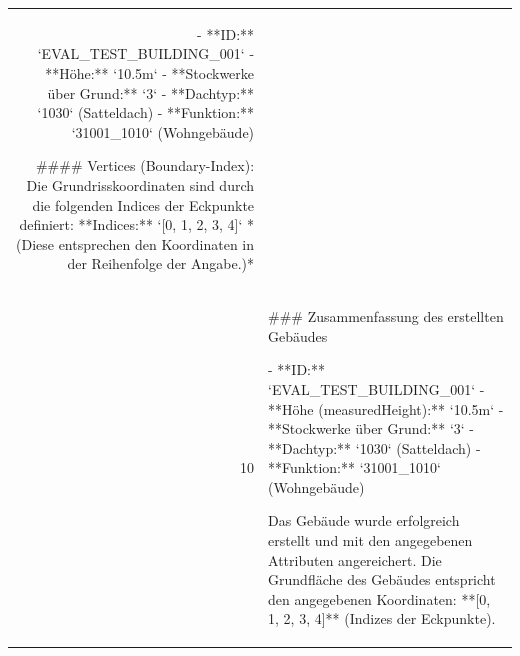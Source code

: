 \documentclass[a4paper,11pt]{article}
\begin{document}
\begin{table}[ht]
\begin{tabular}{r p{12cm}}
- **ID:** `EVAL\_TEST\_BUILDING\_001`
- **Höhe:** `10.5m`
- **Stockwerke über Grund:** `3`
- **Dachtyp:** `1030` (Satteldach)
- **Funktion:** `31001\_1010` (Wohngebäude)

\#\#\#\# Vertices (Boundary-Index):
Die Grundrisskoordinaten sind durch die folgenden Indices der Eckpunkte definiert:
**Indices:** `[0, 1, 2, 3, 4]`
*(Diese entsprechen den Koordinaten in der Reihenfolge der Angabe.)* \\
10 & \#\#\# Zusammenfassung des erstellten Gebäudes

- **ID:** `EVAL\_TEST\_BUILDING\_001`
- **Höhe (measuredHeight):** `10.5m`
- **Stockwerke über Grund:** `3`
- **Dachtyp:** `1030` (Satteldach)
- **Funktion:** `31001\_1010` (Wohngebäude)

Das Gebäude wurde erfolgreich erstellt und mit den angegebenen Attributen angereichert. Die Grundfläche des Gebäudes entspricht den angegebenen Koordinaten:
**[0, 1, 2, 3, 4]** (Indizes der Eckpunkte). \\
\hline
\end{tabular}
\end{table}

\clearpage
\end{document}
